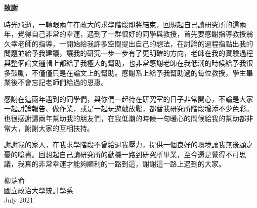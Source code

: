 %
%


\newpage
\cleardoublepage

\setlength{\parindent}{2em}
\thispagestyle{empty}

\vspace*{1cm}

\begin{center}
{\Large \bf 致謝}\\[20pt]     
\end{center}


	時光飛逝，一轉眼兩年在政大的求學階段即將結束，回想起自己讀研究所的這兩年，覺得自己非常的幸運，遇到了一群很好的同學與教授，首先要感謝指導教授\;翁久幸\;老師的指導，一開始給我許多空間提出自己的想法，在討論的過程指點出我的問題並給予我建議，讓我的研究一步一步有了更明確的方向，老師在我的實驗過程與整個論文邏輯上都給了我極大的幫助，也非常感謝老師在我低潮的時候給予我很多鼓勵，不僅僅只是在論文上的幫助。感謝系上給予我幫助過的每位教授，學生畢業後不會忘記老師們給過的恩惠。
	
	感謝在這兩年遇到的同學們，與你們一起待在研究室的日子非常開心，不論是大家一起討論報告、做作業，或是一起玩遊戲放鬆，都替我研究所階段增添不少色彩。也很感謝這兩年幫助我的朋友們，在我低潮的時候一句暖心的問候給我的幫助都非常大，謝謝大家的互相扶持。

	謝謝我的家人，在我求學階段不曾給過我壓力，提供一個良好的環境讓我無後顧之憂的唸書。回想起自己讀研究所的動機一路到研究所畢業，至今還是覺得不可思議，我真的非常幸運才能夠順利的一路到這，謝謝這一路上遇到的大家。


\vspace*{2cm}


\begin{flushright} 
{柳瑞俞\\ 國立政治大學統計學系\\ July 2021\\}
\end{flushright} 

\vspace*{1cm}



\newpage 
\cleardoublepage 
\setlength{\parindent}{2em} 
\thispagestyle{empty}  
\vspace*{1cm}  

